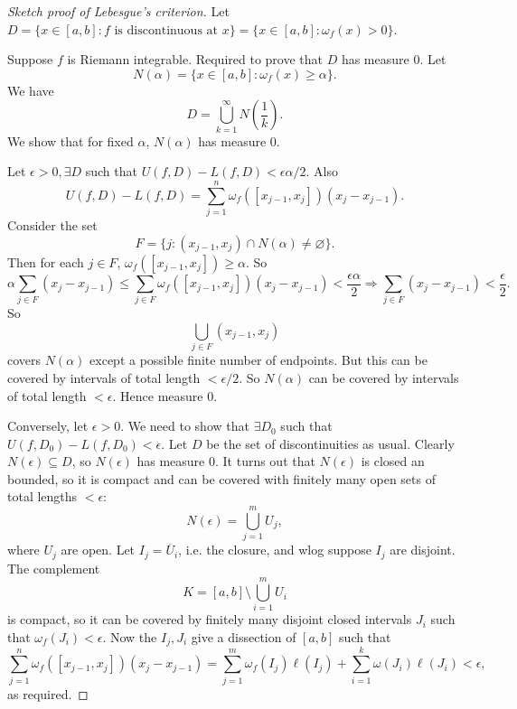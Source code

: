 \begin{proof}[Sketch proof of Lebesgue's criterion]
    Let $ D=\{x\in [a,b]:f \text{ is discontinuous at }x\} = \{x\in [a,b]:\omega_f(x)>0\} $. 
    
    Suppose $f$ is Riemann integrable. Required to prove that $ D $ has measure 0. Let
    \[
        N(\alpha)=\{x\in [a,b]:\omega_f(x)\ge \alpha\}.
    \]
    We have 
    \[
        D= \bigcup_{k=1}^{\infty}N\left( \frac{1}{k} \right).
    \]
    We show that for fixed $ \alpha $, $ N(\alpha) $ has measure 0.

    Let $ \epsilon>0, \exists D $ such that $ U(f,D)-L(f,D)<\epsilon \alpha/2$. Also 
    \[
        U(f,D)-L(f,D) = \sum_{j=1}^{n}\omega_f([x_{j-1},x_j])(x_{j}-x_{j-1}).
    \]
    Consider the set 
    \[
        F = \{j:(x_{j-1},x_j)\cap N(\alpha)\neq \varnothing \}.
    \]
    Then for each $j\in F$, $ \omega_f([x_{j-1},x_j])\ge \alpha $. So 
    \[
        \alpha \sum_{j\in F}(x_{j}-x_{j-1})\le \sum_{j\in F} \omega_f([x_{j-1},x_j])(x_{j}-x_{j-1})<\frac{\epsilon\alpha}{2}\Longrightarrow \sum_{j\in F}(x_{j}-x_{j-1})<\frac{\epsilon}{2}.
    \]
    So
    \[
        \bigcup_{j\in F} (x_{j-1},x_j)
    \]
    covers $N(\alpha)$ except a possible finite number of endpoints. But this can be covered by intervals of total length $ <\epsilon/2 $. So $ N(\alpha) $ can be covered by intervals of total length $ <\epsilon $. Hence measure 0.

    Conversely, let $ \epsilon>0 $. We need to show that $ \exists D_0 $ such that $ U(f,D_0)-L(f,D_0)<\epsilon $. Let $D$ be the set of discontinuities as usual. Clearly $ N(\epsilon) \subseteq D $, so $N(\epsilon)$ has measure 0. It turns out that $N(\epsilon)$ is closed an bounded, so it is compact and can be covered with finitely many open sets of total lengths $ <\epsilon $:
    \[
        N(\epsilon) = \bigcup_{j=1}^{m}U_j,
    \]  
    where $ U_j $ are open. Let $ I_j= \overline{U}_i $, i.e. the closure, and wlog suppose $I_j$ are disjoint. The complement 
    \[
        K = [a,b] \setminus \bigcup_{i=1}^{m}U_i
    \]
    is compact, so it can be covered by finitely many disjoint closed intervals $ J_i $ such that $ \omega_f(J_i)<\epsilon $. Now the $I_j,J_i$ give a dissection of $[a,b]$ such that 
    \[
        \sum_{j=1}^{n}\omega_f([x_{j-1},x_j])(x_{j}-x_{j-1}) = \sum_{j=1}^{m}\omega_f(I_j)\ell(I_j)+\sum_{i=1}^{k}\omega(J_i)\ell (J_i)<\epsilon,
    \]
    as required.
\end{proof}
